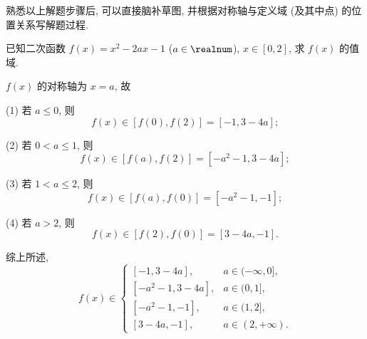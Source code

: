 熟悉以上解题步骤后, 可以直接脑补草图, 并根据对称轴与定义域 (及其中点) 的位置关系写解题过程.

\begin{example}
  已知二次函数 $f(x)=x^2-2ax-1$ ($a\in\realnum$), $x\in[0,2]$, 求 $f(x)$ 的值域.
\end{example}
\begin{solution}
  $f(x)$ 的对称轴为 $x=a$, 故
  
  (1) 若 $a\leqslant 0$, 则 
  \[f(x)\in[f(0),f(2)]= [-1,3-4a];\]
  
  (2) 若 $0<a\leqslant 1$, 则 
  \[f(x)\in[f(a),f(2)]= [-a^2-1,3-4a];\]
  
  (3) 若 $1<a \leqslant 2$, 则 
  \[f(x)\in[f(a),f(0)]= [-a^2-1,-1];\]
  
  (4) 若 $a> 2$, 则 
  \[f(x)\in[f(2),f(0)]= [3-4a,-1].\]
  
  综上所述, 
  \[f(x)\in\begin{cases}
    [-1,3-4a],     & a\in(-\infty,0],\\
    [-a^2-1,3-4a], & a\in (0,1],\\
    [-a^2-1,-1],   & a\in (1,2],\\
    [3-4a,-1],     & a\in (2,+\infty).
  \end{cases}\]
\end{solution}

\endinput